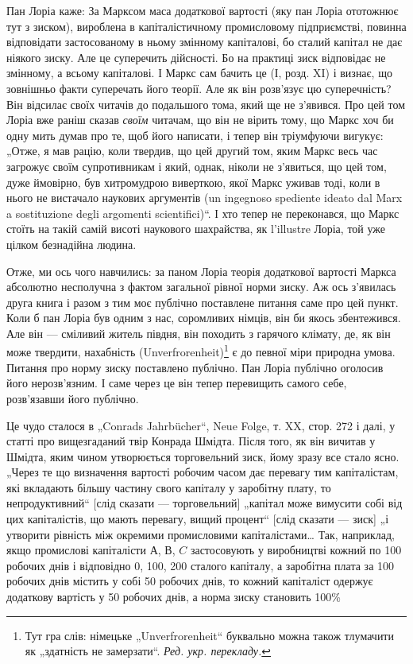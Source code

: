 Пан Лоріа каже: За Марксом маса додаткової вартості (яку
пан Лоріа ототожнює тут з зиском), вироблена в капіталістичному
промисловому підприємстві, повинна відповідати застосованому
в ньому змінному капіталові, бо сталий капітал не дає
ніякого зиску. Але це суперечить дійсності. Бо на практиці зиск
відповідає не змінному, а всьому капіталові. І Маркс сам бачить
це (І, розд. XI) і визнає, що зовнішньо факти суперечать
його теорії. Але як він розв’язує цю суперечність? Він відсилає
своїх читачів до подальшого тома, який ще не з’явився.
Про цей том Лоріа вже раніш сказав \emph{своїм} читачам, що він
не вірить тому, що Маркс хоч би одну мить думав про те,
щоб його написати, і тепер він тріумфуючи вигукує: „Отже,
я мав рацію, коли твердив, що цей другий том, яким Маркс
весь час загрожує своїм супротивникам і який, однак, ніколи
не з’явиться, що цей том, дуже ймовірно, був хитромудрою
виверткою, якої Маркс уживав тоді, коли в нього не
вистачало наукових аргументів (un ingegnoso spediente ideato
dal Marx a sostituzione degli argomenti scientifici)“. І хто тепер
не переконався, що Маркс стоїть на такій самій висоті наукового
шахрайства, як l'illustre Лоріа, той уже цілком безнадійна
людина.

Отже, ми ось чого навчились: за паном Лоріа теорія додаткової
вартості Маркса абсолютно несполучна з фактом загальної
рівної норми зиску. Аж ось з’явилась друга книга і разом
з тим моє публічно поставлене питання саме про цей пункт.
Коли б пан Лоріа був одним з нас, соромливих німців, він би
якось збентежився. Але він — сміливий житель півдня, він походить
з гарячого клімату, де, як він може твердити, нахабність
(Unverfrorenheit)\footnote*{Тут гра слів: німецьке „Unverfrorenheit“ буквально можна також тлумачити
як „здатність не замерзати“. \emph{Ред. укр. перекладу.}} є до певної міри природна умова. Питання
про норму зиску поставлено публічно. Пан Лоріа публічно оголосив
його нерозв’язним. І саме через це він тепер перевищить
самого себе, розв’язавши його публічно.

Це чудо сталося в „Conrads Jahrbücher“, Neue Folge, т. XX,
стор. 272 і далі, у статті про вищезгаданий твір Конрада Шмідта.
Після того, як він вичитав у Шмідта, яким чином утворюється
торговельний зиск, йому зразу все стало ясно. „Через те що
визначення вартості робочим часом дає перевагу тим капіталістам,
які вкладають більшу частину свого капіталу у заробітну
плату, то непродуктивний“ [слід сказати — торговельний] „капітал
може вимусити собі від цих капіталістів, що мають перевагу,
вищий процент“ [слід сказати — зиск] „і утворити рівність
між окремими промисловими капіталістами\dots{} Так, наприклад,
якщо промислові капіталісти $А$, $В$, $C$ застосовують у виробництві
кожний по 100 робочих днів і відповідно 0, 100, 200
сталого капіталу, а заробітна плата за 100 робочих днів містить
у собі 50 робочих днів, то кожний капіталіст одержує додаткову
вартість у 50 робочих днів, а норма зиску становить 100\%
\parbreak{}  %
